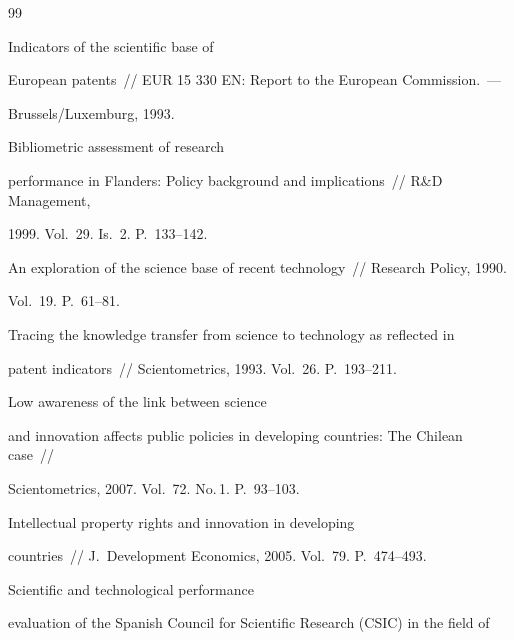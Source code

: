 {{\begin{thebibliography}{99}


 Indicators of the scientific base of 


European patents~/\!\!/ EUR 15 330 EN: Report to the European Commission.~--- 


Brussels/Luxemburg, 1993.







 Bibliometric assessment of research 


performance in Flanders: Policy background and implications~/\!\!/ R\&D Management, 


1999. Vol.~29. Is.~2. P.~133--142.









An exploration of the science base of recent technology~/\!\!/ Research Policy, 1990. 


Vol.~19. P.~61--81.




 Tracing the knowledge transfer from science to technology as reflected in 


patent indicators~/\!\!/ Scientometrics, 1993. Vol.~26. P.~193--211.




 Low awareness of the link between science 


and innovation affects public policies in developing countries: The Chilean case~/\!\!/ 


Scientometrics, 2007. Vol.~72. No.\,1. P.~93--103.




 Intellectual property rights and innovation in developing 


countries~/\!\!/ J.~Development Economics, 2005. Vol.~79. P.~474--493.




 Scientific and technological performance 


evaluation of the Spanish Council for Scientific Research (CSIC) in the field of 



\end{thebibliography}}}
